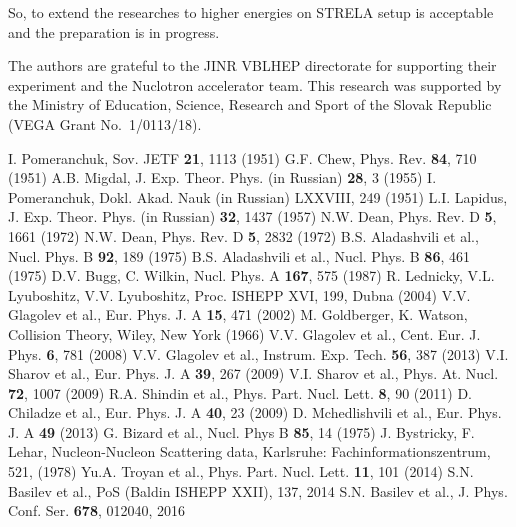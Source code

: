 \documentclass[twocolumn,epjc3]{svjour3}
\begin{document}
So, to extend the researches to higher energies on STRE\-LA setup is acceptable
and the preparation is in progress.

\begin{acknowledgements}
  The authors are grateful to the JINR VBLHEP directorate for supporting their
  experiment and the Nuclotron accelerator team. This research was supported by
  the Ministry of Education, Science, Research and Sport of the Slovak Republic
  (VEGA Grant No.~1/0113/18).
\end{acknowledgements}

\begin{thebibliography}{99}
  I. Pomeranchuk, Sov. JETF \textbf{21}, 1113 (1951)
  G.F. Chew, Phys. Rev. \textbf{84}, 710 (1951)
  A.B. Migdal, J. Exp. Theor. Phys. (in Russian) \textbf{28}, 3 (1955)
  I. Pomeranchuk, Dokl. Akad. Nauk (in Russian) LXXVIII, 249 (1951)
  L.I. Lapidus, J. Exp. Theor. Phys. (in Russian) \textbf{32}, 1437 (1957)
  N.W. Dean, Phys. Rev. D \textbf{5}, 1661 (1972)
  N.W. Dean, Phys. Rev. D \textbf{5}, 2832 (1972)
  B.S. Aladashvili et al., Nucl. Phys. B \textbf{92}, 189 (1975)
  B.S. Aladashvili et al., Nucl. Phys. B \textbf{86}, 461 (1975)
  D.V. Bugg, C. Wilkin, Nucl. Phys. A \textbf{167}, 575 (1987)
  R. Lednicky, V.L. Lyuboshitz, V.V. Lyuboshitz, Proc. ISHEPP XVI, 199,
  Dubna (2004)
  V.V. Glagolev et al., Eur. Phys. J. A \textbf{15}, 471 (2002)
  M. Goldberger, K. Watson, Collision Theory, Wiley, New York (1966)
  V.V. Glagolev et al., Cent. Eur. J. Phys. \textbf{6}, 781 (2008)
  V.V. Glagolev et al., Instrum. Exp. Tech. \textbf{56}, 387 (2013)
  V.I. Sharov et al., Eur. Phys. J. A \textbf{39}, 267 (2009)
  V.I. Sharov et al., Phys. At. Nucl. \textbf{72}, 1007 (2009)
  R.A. Shindin et al., Phys. Part. Nucl. Lett. \textbf{8}, 90 (2011)
  D. Chiladze et al., Eur. Phys. J. A \textbf{40}, 23 (2009)
  D. Mchedlishvili et al., Eur. Phys. J. A \textbf{49} (2013)
  G. Bizard et al., Nucl. Phys B \textbf{85}, 14 (1975)
  J. Bystricky, F. Lehar, Nucleon-Nucleon Scattering data, Karlsruhe:
  Fachinformationszentrum, 521, (1978)
  Yu.A. Troyan et al., Phys. Part. Nucl. Lett. \textbf{11}, 101 (2014)
  S.N. Basilev et al., PoS (Baldin ISHEPP XXII), 137, 2014
  S.N. Basilev et al., J. Phys. Conf. Ser. \textbf{678}, 012040, 2016
\end{thebibliography}
\end{document}
